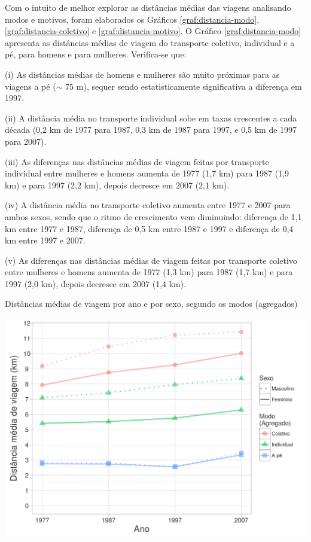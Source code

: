 Com o intuito de melhor explorar as distâncias médias das viagens analisando modos e motivos, foram elaborados os Gráficos \ref{graf:distancia-modo}, \ref{graf:distancia-coletivo} e \ref{graf:distancia-motivo}.
O Gráfico \ref{graf:distancia-modo} apresenta as distâncias médias de viagem do transporte coletivo, individual e a pé, para homens e para mulheres. Verifica-se que:
\begin{compactitem}[]
\item (i) As distâncias médias de homens e mulheres são muito próximas para as viagens a pé ($\sim$ 75 m), sequer sendo estatisticamente significativa a diferença em 1997.
\item (ii) A distância média no transporte individual sobe em taxas crescentes a cada década (0,2 km de 1977 para 1987, 0,3 km de 1987 para 1997, e 0,5 km de 1997 para 2007).
\item (iii)  As diferenças nas distâncias médias de viagem feitas por transporte individual entre mulheres e homens aumenta de 1977 (1,7 km) para 1987 (1,9 km) e para 1997 (2,2 km), depois decresce em 2007 (2,1 km).
\item (iv) A distância média no transporte coletivo aumenta entre 1977 e 2007 para ambos sexos, sendo que o ritmo de crescimento vem diminuindo: diferença de 1,1 km entre 1977 e 1987, diferença de 0,5 km entre 1987 e 1997 e diferença de 0,4 km entre 1997 e 2007.
\item (v)  As diferenças nas distâncias médias de viagem feitas por transporte coletivo entre mulheres e homens aumenta de 1977 (1,3 km) para 1987 (1,7 km) e para 1997 (2,0 km), depois decresce em 2007 (1,4 km).
\end{compactitem}

\begin{grafico}[htb]%
    \caption{\label{graf:distancia-modo}Distâncias médias de viagem por ano e por sexo, segundo os modos (agregados)}%
    \begin{center}%
        \includegraphics[width=1\textwidth]{./imagens/distancia-modo.png}%
    \end{center}%
\end{grafico}%

